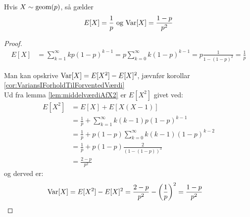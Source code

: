\begin{prop} %
\label{prop:geomEgenskaber}
Hvis $X \sim \textnormal{geom} (p)$, så gælder 
\begin{align*}
    E[X] = \frac{1}{p} \text{ og } \textnormal{Var}[X] = \frac{1-p}{p^2}
\end{align*}
\end{prop}

\begin{proof}
\begin{align*}
    E[X]&=\sum_{k=1}^\infty kp(1-p)^{k-1} =p\sum_{k=0}^\infty k(1-p)^{k-1}=p\frac{1}{1-(1-p)^2}=\frac{1}{p}
\end{align*}

Man kan opskrive $\textnormal{Var}[X] =E[X^2]-E[X]^2$, jævnfør korollar \ref{cor:VariansIForholdTilForventedVærdi}\\
Ud fra lemma \ref{lem:middelværdiAfX2} er $E[X^2]$ givet ved:
\begin{align*}
E[X^2]&=E[X]+E[X(X-1)]\\
    &=\frac{1}{p}+\sum_{k=1}^{\infty}k(k-1)p(1-p)^{k-1}\\
    &=\frac{1}{p} + p(1-p)\sum_{k=0}^{\infty}k(k-1)(1-p)^{k-2}\\
    &=\frac{1}{p}+p(1-p)\frac{2}{(1-(1-p))^3}\\
    &=\frac{2-p}{p^2}
\end{align*}
og derved er:
\begin{align*}
     \textnormal{Var}[X]&=E[X^2]-E[X]^2
     =\frac{2-p}{p^2}-\left(\frac{1}{p}\right)^2=\frac{1-p}{p^2}
\end{align*}
\end{proof}


